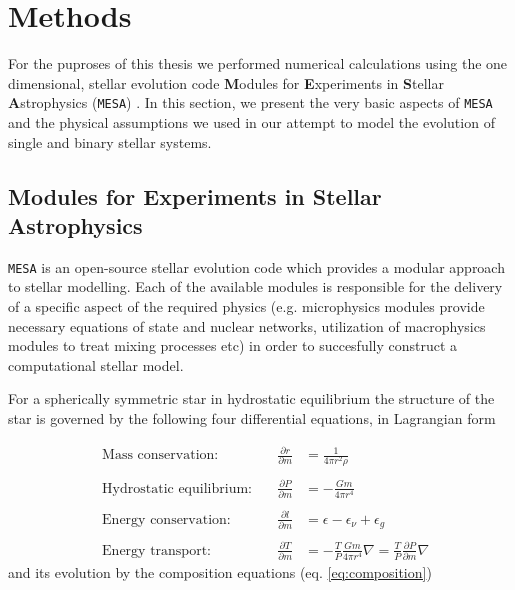 \documentclass[../../main/thesis_msc.tex]{subfiles}
\begin{document}
    \chapter{Methods}
    
    	For the puproses of this thesis we performed numerical calculations using the one dimensional, stellar evolution code \textbf{M}odules for \textbf{E}xperiments in \textbf{S}tellar \textbf{A}strophysics (\texttt{MESA}) \citep{Paxton2011, Paxton:2013pj, Paxton2015, Paxton2018}. In this section, we present the very basic aspects of \texttt{MESA} and the physical assumptions we used in our attempt to model the evolution of single and binary stellar systems.
    	
    		\section{Modules for Experiments in Stellar Astrophysics}
    		
    			\texttt{MESA} is an open-source stellar evolution code which provides a modular approach to stellar modelling. Each of the available modules is responsible for the delivery of a specific aspect of the required physics (e.g. microphysics modules provide necessary equations of state and nuclear networks, utilization of macrophysics modules to treat mixing processes etc) in order to succesfully construct a computational stellar model.
    			
    			For a spherically symmetric star in hydrostatic equilibrium the structure of the star is governed by the following four differential equations, in Lagrangian form
    			
    			\begin{align} 
    				&\textrm{Mass conservation:} &\quad \frac{\partial r}{\partial m} &= \frac{1}{4 \pi r^2 \rho} \label{eq:2.1} \\ \nonumber \\
					&\textrm{Hydrostatic equilibrium:} &\quad \frac{\partial P}{\partial m} &= - \frac{G m}{4 \pi r^4} \\ \nonumber \\
					&\textrm{Energy conservation:} &\quad \frac{\partial l}{\partial m} &= \epsilon - \epsilon_{\nu} + \epsilon_g \\ \nonumber \\
					&\textrm{Energy transport:} &\quad \frac{\partial T}{\partial m} &= - \frac{T}{P} \frac{G m}{4 \pi r^4} \nabla  = \frac{T}{P} \frac{\partial P}{\partial m} \nabla \label{eq:2.4}
				\end{align}
				and its evolution by the composition equations (eq. \ref{eq:composition})
				
\end{document}
